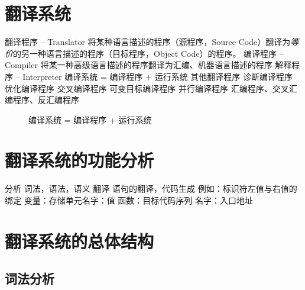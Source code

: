 \documentclass[oneside]{ctexbook}
\begin{document}
\section{翻译系统}
\begin{outline}
    \1 翻译程序 -- Translator
        \2 将某种语言描述的程序（源程序，Source Code）翻译为\emph{等价}的另一种语言描述的程序（目标程序，Object Code）的程序。
    \1 编译程序 -- Compiler
        \2 将某一种高级语言描述的程序翻译为汇编、机器语言描述的程序
    \1 解释程序 -- Interpreter
    \1 编译系统 = 编译程序 + 运行系统
    \1 其他翻译程序
        \2 诊断编译程序
        \2 优化编译程序
        \2 交叉编译程序
        \2 可变目标编译程序
        \2 并行编译程序
        \2 汇编程序、交叉汇编程序、反汇编程序
\end{outline}
\begin{figure}[htp]
    \centering
    \caption{编译系统 = 编译程序 + 运行系统}
\end{figure}
\section{翻译系统的功能分析}
\begin{outline}
    \1 分析
        \2 词法，语法，语义
    \1 翻译
        \2 语句的翻译，代码生成
    \1 例如：标识符左值与右值的绑定
        \1 变量：存储单元\;\;\qquad 名字：值
        \1 函数：目标代码序列\; 名字：入口地址
\end{outline}
\section{翻译系统的总体结构}
\subsection{词法分析}
\end{document}
